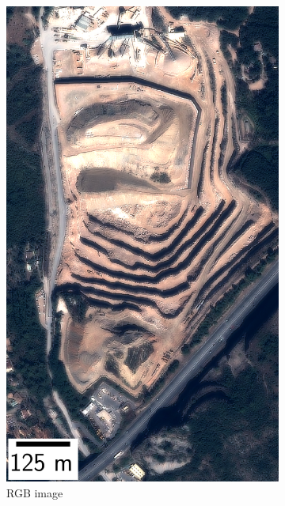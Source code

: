 \begin{figure}
\begin{subfigure}[t]{0.33\linewidth}
        \includegraphics[width=\linewidth]{Images/Chap_6/Carriere_RGB_Monaco.png}
        \caption{RGB image}
        \label{fig:Carriere_RGB}
    \end{subfigure}\hfill
    \begin{subfigure}[t]{0.33\linewidth}
        \flushright

\end{subfigure}
\end{figure}

